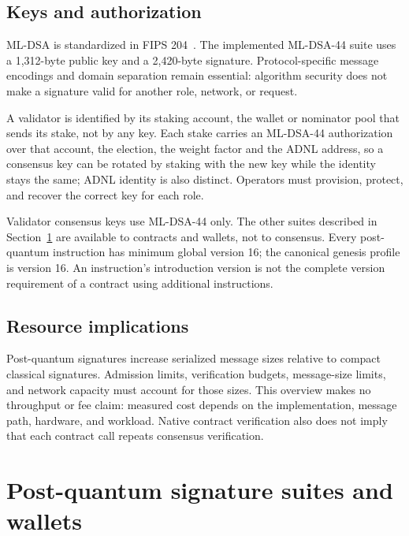 \documentclass[11pt,a4paper]{article}
\begin{document}
\subsection{Keys and authorization}
ML-DSA is standardized in FIPS 204~\cite{fips204}. The implemented ML-DSA-44
suite uses a 1,312-byte public key and a 2,420-byte signature. Protocol-specific
message encodings and domain separation remain essential: algorithm security
does not make a signature valid for another role, network, or request.

A validator is identified by its staking account, the wallet or nominator pool
that sends its stake, not by any key. Each stake carries an ML-DSA-44
authorization over that account, the election, the weight factor and the ADNL
address, so a consensus key can be rotated by staking with the new key while
the identity stays the same; ADNL identity is also distinct. Operators must
provision, protect, and recover the correct key for each role.

Validator consensus keys use ML-DSA-44 only. The other suites described in
Section~\ref{sec:suites} are available to contracts and wallets, not to
consensus. Every post-quantum instruction has minimum global version 16; the
canonical genesis profile is version 16. An instruction's introduction version
is not the complete version requirement of a contract using additional
instructions.

\subsection{Resource implications}
Post-quantum signatures increase serialized message sizes relative to compact
classical signatures. Admission limits, verification budgets, message-size
limits, and network capacity must account for those sizes. This overview
makes no throughput or fee claim: measured cost depends on the implementation,
message path, hardware, and workload. Native contract verification also does
not imply that each contract call repeats consensus verification.

\section{Post-quantum signature suites and wallets}\label{sec:suites}
\end{document}

